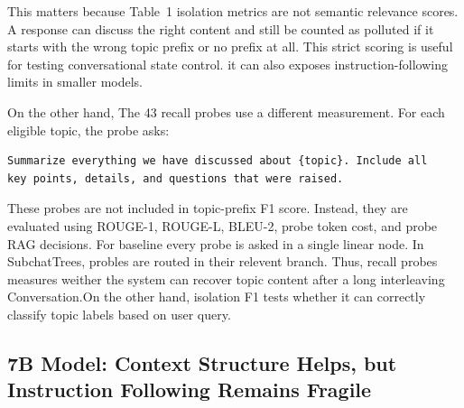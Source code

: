 \documentclass[pdflatex,sn-mathphys-num]{sn-jnl}%
\theoremstyle{thmstyleone}%
\theoremstyle{thmstyletwo}%
\theoremstyle{thmstylethree}%
\begin{document}
This matters because Table~1 isolation metrics are not semantic relevance scores. A response can discuss the right content and still be counted as polluted if it starts with the wrong topic prefix or no prefix at all. This strict scoring is useful for testing conversational state control. it can also exposes instruction-following limits in smaller models.


On the other hand, The 43 recall probes use a different measurement. For each eligible topic, the probe asks:

\begin{verbatim}
Summarize everything we have discussed about {topic}. Include all
key points, details, and questions that were raised.
\end{verbatim}



These probes are not included in topic-prefix F1 score. Instead, they are evaluated using ROUGE-1, ROUGE-L, BLEU-2, probe token cost, and probe RAG decisions. For baseline every probe is asked in a single linear node. In SubchatTrees, probles are routed in their relevent branch. Thus, recall probes measures weither the system can recover topic content after a long interleaving Conversation.On the other hand, isolation F1 tests whether it can correctly classify topic labels based on user query.





\subsection{7B Model: Context Structure Helps, but Instruction Following Remains Fragile}\label{subsec:results_7b}

\end{document}
